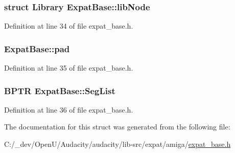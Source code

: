 \subsubsection[{\texorpdfstring{lib\+Node}{libNode}}]{\setlength{\rightskip}{0pt plus 5cm}struct Library Expat\+Base\+::lib\+Node}\hypertarget{struct_expat_base_ab34967762b8740d647d952d13f14b0aa}{}\label{struct_expat_base_ab34967762b8740d647d952d13f14b0aa}


Definition at line 34 of file expat\+\_\+base.\+h.

\subsubsection[{\texorpdfstring{pad}{pad}}]{ Expat\+Base\+::pad}\hypertarget{struct_expat_base_a4fccec5b6c3957501a235dc809fbf396}{}\label{struct_expat_base_a4fccec5b6c3957501a235dc809fbf396}


Definition at line 35 of file expat\+\_\+base.\+h.

\subsubsection[{\texorpdfstring{Seg\+List}{SegList}}]{\setlength{\rightskip}{0pt plus 5cm}B\+P\+TR Expat\+Base\+::\+Seg\+List}\hypertarget{struct_expat_base_adbbfd90e7b769472dda209586f316a1c}{}\label{struct_expat_base_adbbfd90e7b769472dda209586f316a1c}


Definition at line 36 of file expat\+\_\+base.\+h.



The documentation for this struct was generated from the following file\+:\begin{DoxyCompactItemize}
\item 
C\+:/\+\_\+dev/\+Open\+U/\+Audacity/audacity/lib-\/src/expat/amiga/\hyperlink{expat__base_8h}{expat\+\_\+base.\+h}\end{DoxyCompactItemize}

